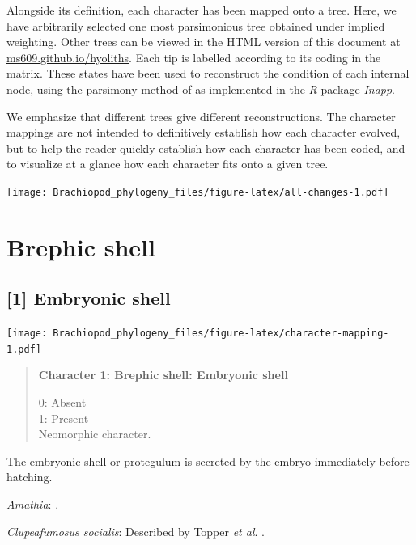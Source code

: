 \documentclass[openany]{book}
\begin{document}
Alongside its definition, each character has been mapped onto a tree.
Here, we have arbitrarily selected one most parsimonious tree obtained
under implied weighting. Other trees can be viewed in the HTML version
of this document at
\href{https://ms609.github.io/hyoliths/reconstructions.html}{ms609.github.io/hyoliths}.
Each tip is labelled according to its coding in the matrix. These states
have been used to reconstruct the condition of each internal node, using
the parsimony method of \citet{Brazeau2018} as implemented in the
\emph{R} package \emph{Inapp}.

We emphasize that different trees give different reconstructions. The
character mappings are not intended to definitively establish how each
character evolved, but to help the reader quickly establish how each
character has been coded, and to visualize at a glance how each
character fits onto a given tree.







\texttt{[image: Brachiopod\_phylogeny\_files/figure-latex/all-changes-1.pdf]}

\section{Brephic shell}\label{brephic-shell}

\subsection*{{[}1{]} Embryonic shell}\label{embryonic-shell}

\texttt{[image: Brachiopod\_phylogeny\_files/figure-latex/character-mapping-1.pdf]}

\begin{quote}
\textbf{Character 1: Brephic shell: Embryonic shell}

0: Absent\\
1: Present\\
Neomorphic character.
\end{quote}

The embryonic shell or protegulum is secreted by the embryo immediately
before hatching.

\hypertarget{Amathia-coding-1}{}
\emph{Amathia}: \citet{Reed1982}.

\hypertarget{Clupeafumosus_socialis-coding-1}{}
\emph{Clupeafumosus socialis}: Described by Topper \emph{et al}.
\citeyearpar{Topper2013Reappraisalof}.
\end{document}
